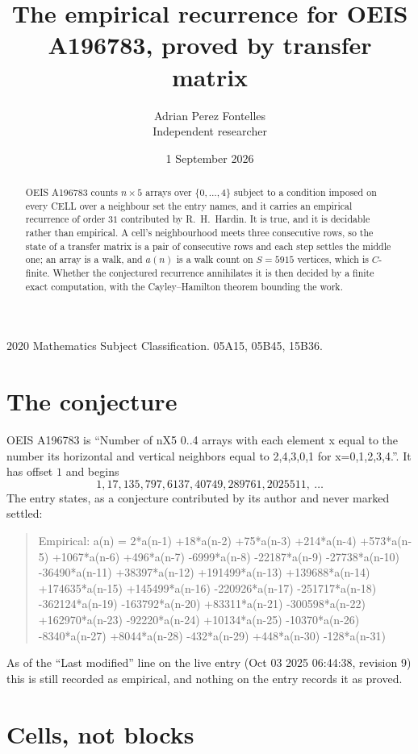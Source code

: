 \documentclass[11pt,a4paper]{article}
\title{The empirical recurrence for OEIS A196783, proved by transfer matrix}
\author{Adrian Perez Fontelles\\ \small Independent researcher}
\date{1 September 2026}
\theoremstyle{plain}
\theoremstyle{definition}
\begin{document}
\maketitle

\begin{abstract}
OEIS A196783 counts $n\times5$ arrays over $\{0,\dots,4\}$ subject to a condition imposed on
every CELL over a neighbour set the entry names, and it carries an empirical recurrence of
order $31$ contributed by R.~H.~Hardin. It is true, and it is decidable rather than
empirical. A cell's neighbourhood meets three consecutive rows, so the state of a transfer
matrix is a pair of consecutive rows and each step settles the middle one; an array is a
walk, and $a(n)$ is a walk count on $S=5915$ vertices, which is $C$-finite. Whether the
conjectured recurrence annihilates it is then decided by a finite exact computation, with the
Cayley--Hamilton theorem bounding the work.
\end{abstract}

\noindent\small 2020 Mathematics Subject Classification. 05A15, 05B45, 15B36.\normalsize

\section{The conjecture}

OEIS A196783 is ``Number of nX5 0..4 arrays with each element x equal to the number its horizontal and vertical neighbors equal to 2,4,3,0,1 for x=0,1,2,3,4.''. It has offset $1$ and begins
\[
1, 17, 135, 797, 6137, 40749, 289761, 2025511,\ \dots
\]
The entry states, as a conjecture contributed by its author and never marked settled:
\begin{quote}
Empirical: a(n) = 2*a(n-1) +18*a(n-2) +75*a(n-3) +214*a(n-4) +573*a(n-5) +1067*a(n-6) +496*a(n-7) -6999*a(n-8) -22187*a(n-9) -27738*a(n-10) -36490*a(n-11) +38397*a(n-12) +191499*a(n-13) +139688*a(n-14) +174635*a(n-15) +145499*a(n-16) -220926*a(n-17) -251717*a(n-18) -362124*a(n-19) -163792*a(n-20) +83311*a(n-21) -300598*a(n-22) +162970*a(n-23) -92220*a(n-24) +10134*a(n-25) -10370*a(n-26) -8340*a(n-27) +8044*a(n-28) -432*a(n-29) +448*a(n-30) -128*a(n-31)
\end{quote}
As of the ``Last modified'' line on the live entry (Oct 03 2025 06:44:38, revision 9) this is still
recorded as empirical, and nothing on the entry records it as proved.

\section{Cells, not blocks}
\end{document}
